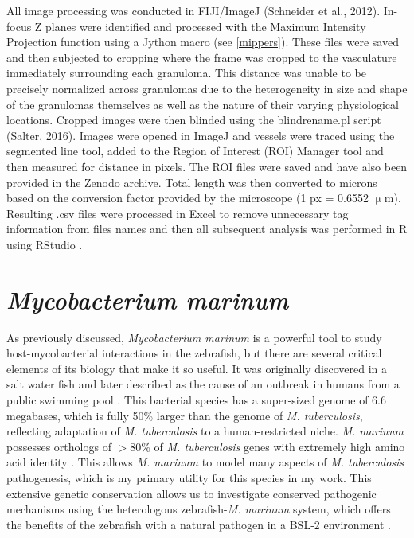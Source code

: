 All image processing was conducted in FIJI/ImageJ (Schneider et al., 2012). In-focus Z planes were identified and processed with the Maximum Intensity Projection function using a Jython macro (see \autoref{mippers}). These files were saved and then subjected to cropping where the frame was cropped to the vasculature immediately surrounding each granuloma. This distance was unable to be precisely normalized across granulomas due to the heterogeneity in size and shape of the granulomas themselves as well as the nature of their varying physiological locations. Cropped images were then blinded using the blindrename.pl script (Salter, 2016). Images were opened in ImageJ and vessels were traced using the segmented line tool, added to the Region of Interest (ROI) Manager tool and then measured for distance in pixels. The ROI files were saved and have also been provided in the Zenodo archive. Total length was then converted to microns based on the conversion factor provided by the microscope (1 px = 0.6552 $\upmu$m). Resulting .csv files were processed in Excel to remove unnecessary tag information from files names and then all subsequent analysis was performed in R using RStudio \citep{RCoreTeam2022, RStudioTeam2022}.

\section{\textit{Mycobacterium marinum}}\label{marinum}

As previously discussed, \textit{Mycobacterium marinum} is a powerful tool to study host-mycobacterial interactions in the zebrafish, but there are several critical elements of its biology that make it so useful. It was originally discovered in a salt water fish and later described as the cause of an outbreak in humans from a public swimming pool \citep{Aronson1926, Linell1954}. This bacterial species has a super-sized genome of 6.6 megabases, which is fully 50\% larger than the genome of \textit{M. tuberculosis}, reflecting adaptation of \textit{M. tuberculosis} to a human-restricted niche. \textit{M. marinum} possesses orthologs of $>$80\% of \textit{M. tuberculosis} genes with extremely high amino acid identity \citep{Stinear2008}. This allows \textit{M. marinum} to model many aspects of \textit{M. tuberculosis} pathogenesis, which is my primary utility for this species in my work. This extensive genetic conservation allows us to investigate conserved pathogenic mechanisms using the heterologous zebrafish-\textit{M. marinum} system, which offers the benefits of the zebrafish with a natural pathogen in a BSL-2 environment \citep{Tobin2008}. 

